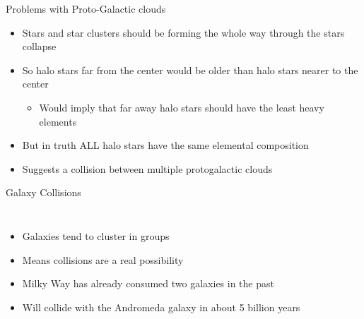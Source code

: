 \documentclass[pdf,aspectratio=169]{beamer}
\begin{document}
\begin{frame}{Problems with Proto-Galactic clouds}
  \begin{itemize}
	\item Stars and star clusters should be forming the whole way through the stars collapse
	\item So halo stars far from the center would be older than halo stars nearer to the center
	  \begin{itemize}
		\item Would imply that far away halo stars should have the least heavy elements
	  \end{itemize}
	\item But in truth ALL halo stars have the same elemental composition
	\item Suggests a collision between multiple protogalactic clouds
  \end{itemize}
\end{frame}

\begin{frame}{Galaxy Collisions}
  \begin{columns}
	\begin{itemize}
	  \item Galaxies tend to cluster in groups
	  \item Means collisions are a real possibility
	  \item Milky Way has already consumed two galaxies in the past
	  \item Will collide with the Andromeda galaxy in about 5 billion years
	\end{itemize}
	\begin{center}
	\end{center}
  \end{columns}
\end{frame}
\end{document}
